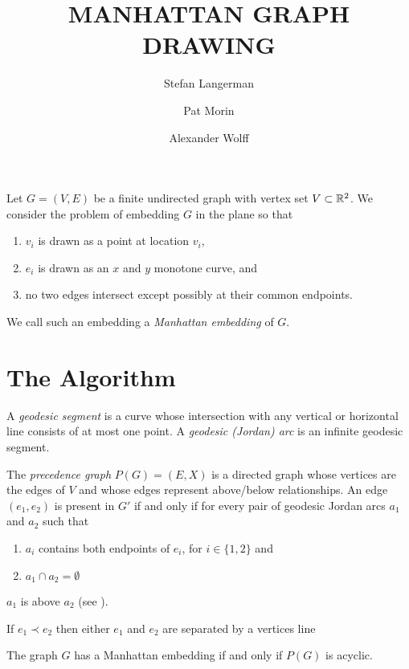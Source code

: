 \documentclass[lotsofwhite]{patmorin}
\title{\MakeUppercase{Manhattan Graph Drawing}}
\author{Stefan Langerman \and Pat Morin \and Alexander Wolff}
\date{}
\begin{document}
\maketitle

Let $G=(V,E)$ be a finite undirected graph with vertex set
$V\subset\mathbb{R}^2$.  We consider the problem of embedding $G$ in the plane
so that
\begin{enumerate}
\item $v_i$ is drawn as a point at location $v_i$,
\item $e_i$ is drawn as an $x$ and $y$ monotone curve, and
\item no two edges intersect except possibly at their common endpoints.
\end{enumerate}
We call such an embedding a \emph{Manhattan embedding} of $G$.

\section{The Algorithm}

A \emph{geodesic segment} is a curve whose intersection with any
vertical or horizontal line consists of at most one point. A
\emph{geodesic (Jordan) arc} is an infinite geodesic segment.

The \emph{precedence graph} $P(G)=(E,X)$ is a directed graph whose
vertices are the edges of $V$ and whose edges represent above/below
relationships.  An edge $(e_1,e_2)$ is present in $G'$ if and only if
for every pair of geodesic Jordan arcs $a_1$ and $a_2$ such that
\begin{enumerate}
\item $a_i$ contains both endpoints of $e_i$, for $i\in\{1,2\}$ and
\item $a_1\cap a_2=\emptyset$
\end{enumerate}
$a_1$ is above $a_2$ (see ).

\begin{lem}
If $e_1\prec e_2$ then either $e_1$ and $e_2$ are separated by a
vertices line
\end{lem}

\begin{lem}
The graph $G$ has a Manhattan embedding if and only if $P(G)$ is
acyclic.
\end{lem}
\end{document}
